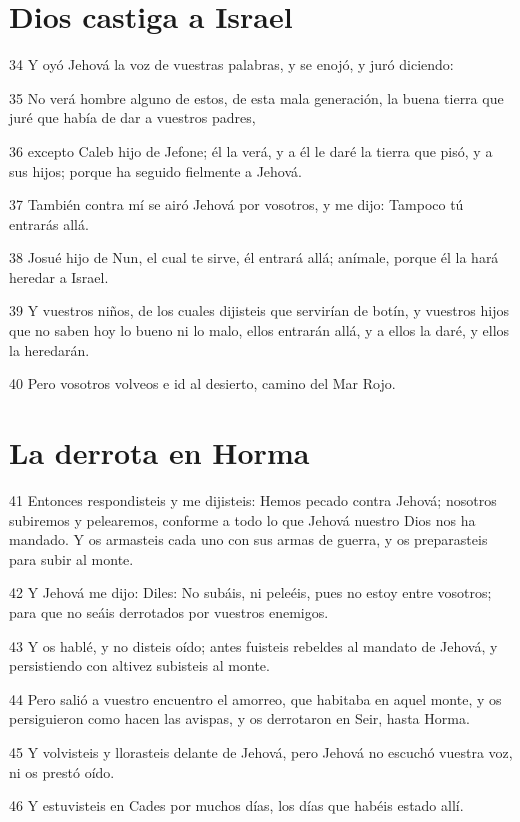 \section{Dios castiga a Israel }

\par 34 Y oyó Jehová la voz de vuestras palabras, y se enojó, y juró diciendo:
\par 35 No verá hombre alguno de estos, de esta mala generación, la buena tierra que juré que había de dar a vuestros padres,
\par 36 excepto Caleb hijo de Jefone; él la verá, y a él le daré la tierra que pisó, y a sus hijos; porque ha seguido fielmente a Jehová.
\par 37 También contra mí se airó Jehová por vosotros, y me dijo: Tampoco tú entrarás allá.
\par 38 Josué hijo de Nun, el cual te sirve, él entrará allá; anímale, porque él la hará heredar a Israel.
\par 39 Y vuestros niños, de los cuales dijisteis que servirían de botín, y vuestros hijos que no saben hoy lo bueno ni lo malo, ellos entrarán allá, y a ellos la daré, y ellos la heredarán.
\par 40 Pero vosotros volveos e id al desierto, camino del Mar Rojo.

\section{La derrota en Horma }

\par 41 Entonces respondisteis y me dijisteis: Hemos pecado contra Jehová; nosotros subiremos y pelearemos, conforme a todo lo que Jehová nuestro Dios nos ha mandado. Y os armasteis cada uno con sus armas de guerra, y os preparasteis para subir al monte.
\par 42 Y Jehová me dijo: Diles: No subáis, ni peleéis, pues no estoy entre vosotros; para que no seáis derrotados por vuestros enemigos.
\par 43 Y os hablé, y no disteis oído; antes fuisteis rebeldes al mandato de Jehová, y persistiendo con altivez subisteis al monte.
\par 44 Pero salió a vuestro encuentro el amorreo, que habitaba en aquel monte, y os persiguieron como hacen las avispas, y os derrotaron en Seir, hasta Horma.
\par 45 Y volvisteis y llorasteis delante de Jehová, pero Jehová no escuchó vuestra voz, ni os prestó oído.
\par 46 Y estuvisteis en Cades por muchos días, los días que habéis estado allí.

